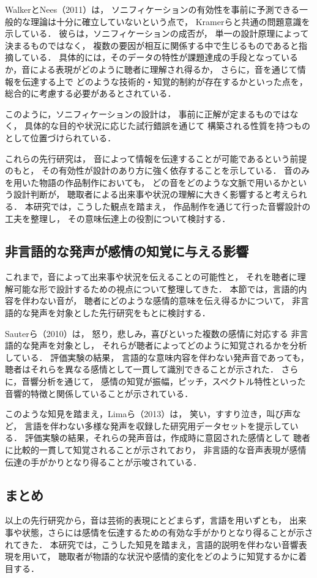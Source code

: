 WalkerとNees（2011）\cite{hermann_sonification_2011}は，
ソニフィケーションの有効性を事前に予測できる一般的な理論は十分に確立していないという点で，
Kramerらと共通の問題意識を示している．
彼らは，ソニフィケーションの成否が，
単一の設計原理によって決まるものではなく，
複数の要因が相互に関係する中で生じるものであると指摘している．
具体的には，そのデータの特性が課題達成の手段となっているか，音による表現がどのように聴者に理解され得るか，
さらに，音を通じて情報を伝達する上で
どのような技術的・知覚的制約が存在するかといった点を，
総合的に考慮する必要があるとされている．

このように，ソニフィケーションの設計は，
事前に正解が定まるものではなく，
具体的な目的や状況に応じた試行錯誤を通じて
構築される性質を持つものとして位置づけられている．

これらの先行研究は，
音によって情報を伝達することが可能であるという前提のもと，
その有効性が設計のあり方に強く依存することを示している．
音のみを用いた物語の作品制作においても，
どの音をどのような文脈で用いるかという設計判断が，
聴取者による出来事や状況の理解に大きく影響すると考えられる．
本研究では，こうした観点を踏まえ，
作品制作を通じて行った音響設計の工夫を整理し，
その意味伝達上の役割について検討する．


\subsection{非言語的な発声が感情の知覚に与える影響}

これまで，音によって出来事や状況を伝えることの可能性と，
それを聴者に理解可能な形で設計するための視点について整理してきた．
本節では，言語的内容を伴わない音が，
聴者にどのような感情的意味を伝え得るかについて，
非言語的な発声を対象とした先行研究をもとに検討する．

Sauterら（2010）\cite{sauter_perceptual_2010}は，
怒り，悲しみ，喜びといった複数の感情に対応する
非言語的な発声を対象とし，
それらが聴者によってどのように知覚されるかを分析している．
評価実験の結果，
言語的な意味内容を伴わない発声音であっても，
聴者はそれらを異なる感情として一貫して識別できることが示された．
さらに，音響分析を通じて，
感情の知覚が振幅，ピッチ，スペクトル特性といった
音響的特徴と関係していることが示されている．

このような知見を踏まえ，Limaら（2013）\cite{lima_when_2013}は，
笑い，すすり泣き，叫び声など，
言語を伴わない多様な発声を収録した研究用データセットを提示している．
評価実験の結果，それらの発声音は，作成時に意図された感情として
聴者に比較的一貫して知覚されることが示されており，
非言語的な音声表現が感情伝達の手がかりとなり得ることが示唆されている．

\subsection{まとめ}
以上の先行研究から，音は芸術的表現にとどまらず，言語を用いずとも，
出来事や状態，さらには感情を伝達するための有効な手がかりとなり得ることが示されてきた．
本研究では，こうした知見を踏まえ，言語的説明を伴わない音響表現を用いて，
聴取者が物語的な状況や感情的変化をどのように知覚するかに着目する．
